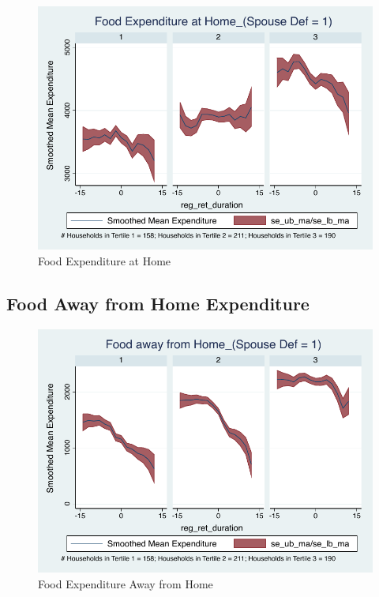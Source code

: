 \documentclass[a4paper]{article}
\begin{document}
\begin{figure}[h]
	\caption{Food Expenditure at Home}
	\centering
	\includegraphics[width=1.0\textwidth]{../ConsumptionPostRetirement_by_SpouseDef_Cats/Smoothed/1/spouse_def_total_foodexp_home_real.pdf}
\end{figure}





\clearpage

\subsection{Food Away from Home Expenditure}

\begin{table}[h]
	\centering
	
\end{table}

\begin{figure}[h]
	\caption{Food Expenditure Away from Home}
	\centering
	\includegraphics[width=1.0\textwidth]{../ConsumptionPostRetirement_by_SpouseDef_Cats/Smoothed/1/spouse_def_total_foodexp_away_real.pdf}
\end{figure}
\clearpage
\end{document}
